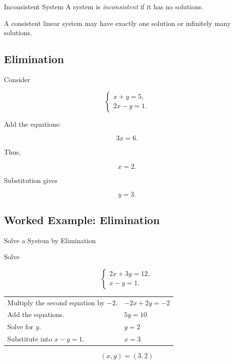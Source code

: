 \begin{definitionbox}{Inconsistent System}
A system is \emph{inconsistent} if it has no solutions.
\end{definitionbox}

A consistent linear system may have exactly one solution or infinitely many
solutions.

\subsection{Elimination}
\label{subsec:linear-elimination}

Consider

\[ \begin{cases} x+y=5,\\ 2x-y=1. \end{cases} \]

Add the equations:

\[ 3x=6. \]

Thus,

\[ x=2. \]

Substitution gives

\[ y=3. \]

\subsection{Worked Example: Elimination}
\label{subsec:worked-linear-system}

\begin{workedexamplebox}{Solve a System by Elimination}

Solve

\[ \begin{cases} 2x+3y=12,\\ x-y=1. \end{cases} \]

\begin{tabularx}{\textwidth}{@{}>{\raggedright\arraybackslash}p{}X@{}}
Multiply the second equation by \(-2\). & \(-2x+2y=-2\)\\
Add the equations. & \(5y=10\)\\
Solve for \(y\). & \(y=2\)\\
Substitute into \(x-y=1\). & \(x=3\)
\end{tabularx}

\begin{answerbox}
\[ (x,y)=(3,2) \]
\end{answerbox}
\end{workedexamplebox}

